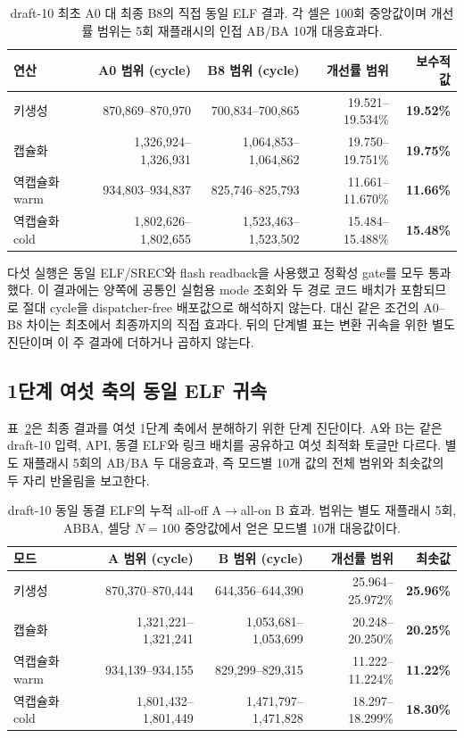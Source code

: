 \documentclass[runningheads,orivec]{llncs}
\begin{document}
\begin{table}[H]\centering\small
\caption{draft-10 최초 A0 대 최종 B8의 직접 동일 ELF 결과. 각 셀은 100회 중앙값이며
개선률 범위는 5회 재플래시의 인접 AB/BA 10개 대응효과다.}
\label{tab:final-direct}
\setlength{\tabcolsep}{2.2pt}
\begin{tabular}{lrrrr}\toprule
연산 & A0 범위 (cycle) & B8 범위 (cycle) & 개선률 범위 & 보수적 값\\\midrule
키생성 & 870,869--870,970 & 700,834--700,865 & 19.521--19.534\% & \textbf{19.52\%}\\
캡슐화 & 1,326,924--1,326,931 & 1,064,853--1,064,862 & 19.750--19.751\% & \textbf{19.75\%}\\
역캡슐화 warm & 934,803--934,837 & 825,746--825,793 & 11.661--11.670\% & \textbf{11.66\%}\\
역캡슐화 cold & 1,802,626--1,802,655 & 1,523,463--1,523,502 & 15.484--15.488\% & \textbf{15.48\%}\\\bottomrule
\end{tabular}
\end{table}
\FloatBarrier

다섯 실행은 동일 ELF/SREC와 flash readback을 사용했고 정확성 gate를 모두 통과했다.
이 결과에는 양쪽에 공통인 실험용 mode 조회와 두 경로 코드 배치가 포함되므로 절대
cycle을 dispatcher-free 배포값으로 해석하지 않는다. 대신 같은 조건의 A0--B8 차이는
최초에서 최종까지의 직접 효과다. 뒤의 단계별 표는 변환 귀속을 위한 별도 진단이며 이
주 결과에 더하거나 곱하지 않는다.

\subsection{1단계 여섯 축의 동일 ELF 귀속}\label{sec:cumulative}

표~\ref{tab:cumulative}은 최종 결과를 여섯 1단계 축에서 분해하기 위한 단계 진단이다. A와 B는 같은 draft-10
입력, API, 동결 ELF와 링크 배치를 공유하고 여섯 최적화 토글만 다르다. 별도
재플래시 5회의 AB/BA 두 대응효과, 즉 모드별 10개 값의 전체 범위와 최솟값의
두 자리 반올림을 보고한다.

\begin{table}[H]\centering\small
\caption{draft-10 동일 동결 ELF의 누적 all-off A$\to$all-on B 효과. 범위는 별도
재플래시 5회, ABBA, 셀당 $N=100$ 중앙값에서 얻은 모드별 10개 대응값이다.}
\label{tab:cumulative}
\setlength{\tabcolsep}{2.2pt}
\begin{tabular}{lrrrr}\toprule
모드 & A 범위 (cycle) & B 범위 (cycle) & 개선률 범위 & 최솟값\\\midrule
키생성 & 870,370--870,444 & 644,356--644,390 & 25.964--25.972\% & \textbf{25.96\%}\\
캡슐화 & 1,321,221--1,321,241 & 1,053,681--1,053,699 & 20.248--20.250\% & \textbf{20.25\%}\\
역캡슐화 warm & 934,139--934,155 & 829,299--829,315 & 11.222--11.224\% & \textbf{11.22\%}\\
역캡슐화 cold & 1,801,432--1,801,449 & 1,471,797--1,471,828 & 18.297--18.299\% & \textbf{18.30\%}\\\bottomrule
\end{tabular}
\end{table}
\FloatBarrier
\end{document}
